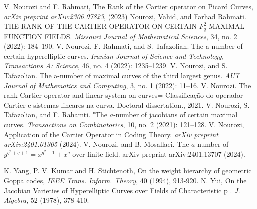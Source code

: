 \begin{thebibliography}{99}
 V. Nourozi and F. Rahmati, The Rank of the Cartier operator on Picard Curves, {\it arXiv preprint arXiv:2306.07823}, (2023)
 Nourozi, Vahid, and Farhad Rahmati. THE RANK OF THE CARTIER OPERATOR ON CERTAIN $F_q^2$-MAXIMAL FUNCTION FIELDS. {\it Missouri Journal of Mathematical Sciences}, 34, no. 2 (2022): 184–190.
 V. Nourozi, F. Rahmati, and S. Tafazolian. The a-number of certain hyperelliptic curves. {\it Iranian Journal of Science and Technology, Transactions A: Science}, 46, no. 4 (2022): 1235–1239.
 V. Nourozi, and S. Tafazolian. The a-number of maximal curves of the third largest genus. {\it AUT Journal of Mathematics and Computing}, 3, no. 1 (2022): 11–16.
 V. Nourozi. The rank Cartier operator and linear system on curves= Classificação do operador Cartier e sistemas lineares na curva. Doctoral dissertation., 2021.
 V. Nourozi, S. Tafazolian, and F. Rahamti. "The $a$-number of jacobians of certain maximal curves. {\it Transactions on Combinatorics}, 10, no. 2 (2021): 121–128.
 V. Nourozi,  Application of the Cartier Operator in Coding Theory. {\it arXiv preprint arXiv:2401.01305} (2024).
 V. Nourozi, and B. Mosallaei. The $ a $-number of $ y^{q^ 2+ q+ 1}= x^{q^ 2+ 1}+ x^ q $ over finite field. arXiv preprint arXiv:2401.13707 (2024).
 
 K. Yang, P. V. Kumar and H. Stichtenoth, On the weight hierarchy of geometric Goppa codes, {\it IEEE Trans. Inform. Theory}, 40 (1994), 913-920.
  N. Yui,  On the Jacobian Varieties of Hyperelliptic Curves over Fields of Characteristic p . {\it J. Algebra}, 52 (1978), 378-410.






\end{thebibliography}

